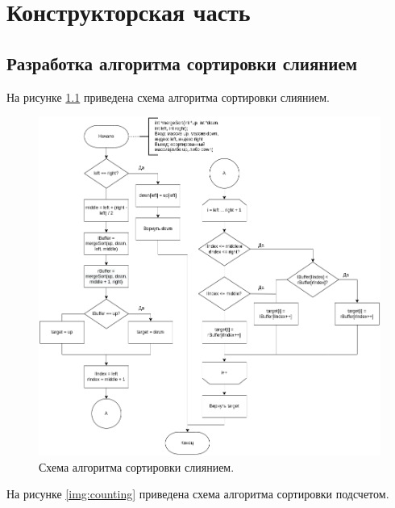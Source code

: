 \chapter{Конструкторская часть}

\section{Разработка алгоритма сортировки слиянием}

На рисунке \ref{img:merge} приведена схема алгоритма сортировки слиянием.
\begin{figure}[h]
	\centering
	\includegraphics[width=170mm]{images/merge}
	\caption{Схема алгоритма сортировки слиянием.}
	\label{img:merge}
\end{figure}
\newpage
На рисунке \ref{img:counting} приведена схема алгоритма сортировки подсчетом.

